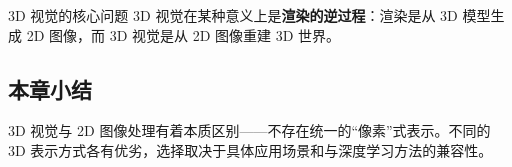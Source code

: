 \begin{knowledgebox}{3D 视觉的核心问题}
3D 视觉在某种意义上是\textbf{渲染的逆过程}：渲染是从 3D 模型生成 2D 图像，而 3D 视觉是从 2D 图像重建 3D 世界。
\end{knowledgebox}

\subsection{本章小结}

3D 视觉与 2D 图像处理有着本质区别——不存在统一的``像素''式表示。不同的 3D 表示方式各有优劣，选择取决于具体应用场景和与深度学习方法的兼容性。


